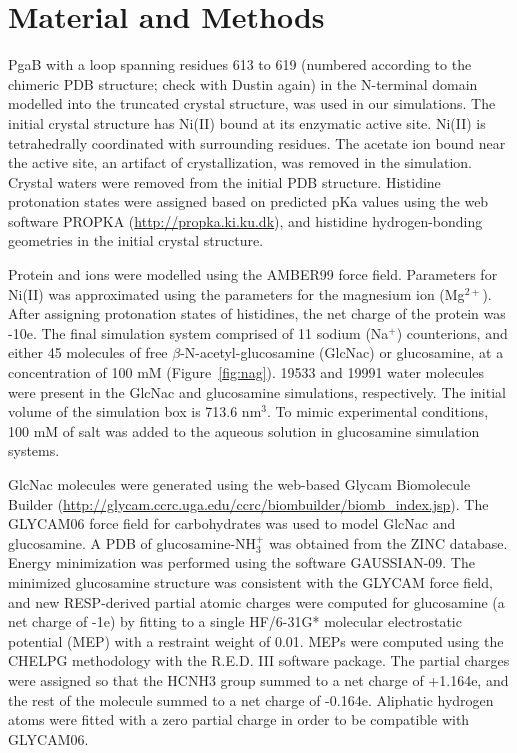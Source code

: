 \section{Material and Methods}
PgaB with a loop spanning residues 613 to 619 (numbered according to the chimeric PDB structure; check with Dustin again) in the N-terminal domain modelled into the truncated crystal structure, was used in our simulations. The initial crystal structure has Ni(II) bound at its enzymatic active site. Ni(II) is tetrahedrally coordinated with surrounding residues.  The acetate ion bound near the active site, an artifact of crystallization, was removed in the simulation. Crystal waters were removed from the initial PDB structure. Histidine protonation states were assigned based on predicted pKa values using the web software PROPKA (\url{http://propka.ki.ku.dk}), and histidine hydrogen-bonding geometries in the initial crystal structure.

Protein and ions were modelled using the AMBER99 force field.\cite{Cornell:1995td} Parameters for Ni(II) was approximated using the parameters for the magnesium ion (Mg$^{2+}$). After assigning protonation states of histidines, the net charge of the protein was -10e. The final simulation system comprised of 11 sodium (Na$^{+}$) counterions, and either 45 molecules of free $\beta$-N-acetyl-glucosamine (GlcNac) or glucosamine, at a concentration of 100 mM (Figure~\ref{fig:nag}). 19533 and 19991 water molecules were present in the GlcNac and glucosamine simulations, respectively. The initial volume of the simulation box is 713.6 nm$^{3}$.  To mimic experimental conditions, 100 mM of salt was added to the aqueous solution in glucosamine simulation systems.

GlcNac molecules were generated using the web-based Glycam Biomolecule Builder (\url{http://glycam.ccrc.uga.edu/ccrc/biombuilder/biomb_index.jsp}). The GLYCAM06 force field for carbohydrates\cite{Kirschner:2008ii} was used to model GlcNac and glucosamine. A PDB of glucosamine-$\textrm{NH}_{3}^{+}$ was obtained from the ZINC database.\cite{Irwin:2005kx} Energy minimization was performed using the software GAUSSIAN-09.\cite{g09} The minimized glucosamine structure was consistent with the GLYCAM force field, and new RESP-derived partial atomic charges were computed for glucosamine (a net charge of -1e) by fitting to a single HF/6-31G* molecular electrostatic potential (MEP) with a restraint weight of 0.01. MEPs were computed using the CHELPG methodology\cite{Breneman:1990ue} with the R.E.D. III software package.\cite{Dupradeau:2010bb} The partial charges were assigned so that the HCNH3 group summed to a net charge of +1.164e, and the rest of the molecule summed to a net charge of -0.164e. Aliphatic hydrogen atoms were fitted with a zero partial charge in order to be compatible with GLYCAM06.

